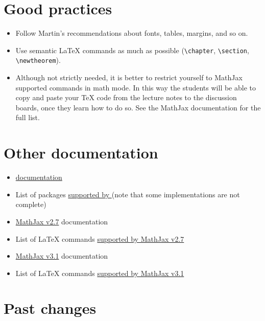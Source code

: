 \documentclass[a4paper]{article}
\def\ltxinline{\lstinline[style=latexml,frame=none]}
\theoremstyle{definition}
\begin{document}
\section{Good practices}
\begin{itemize}
  \item Follow Martin's recommendations about fonts, tables, margins, and so on.
  \item Use semantic \LaTeX{} commands as much as possible (\ltxinline|\chapter|, \ltxinline|\section|, \ltxinline|\newtheorem|).
  \item Although not strictly needed, it is better to restrict yourself to MathJax supported commands in math mode. In this way the students will be able to copy and paste your \TeX{} code from the lecture notes to the discussion boards, once they learn how to do so. See the MathJax documentation for the full list.
\end{itemize}

\section{Other documentation}
\begin{itemize}
  \item \href{https://dlmf.nist.gov/LaTeXML/docs.html}{\LaTeXML{} documentation}
  \item List of packages \href{https://dlmf.nist.gov/LaTeXML/manual/included.bindings/}{supported by \LaTeXML{}} (note that some implementations are not complete)
  \item \href{http://docs.mathjax.org/en/v2.7-latest/}{MathJax v2.7} documentation
  \item List of \LaTeX{} commands \href{http://docs.mathjax.org/en/v2.7-latest/tex.html#supported-latex-commands}{supported by MathJax v2.7}
  \item \href{http://docs.mathjax.org/en/v3.1-latest/}{MathJax v3.1} documentation
  \item List of \LaTeX{} commands \href{http://docs.mathjax.org/en/v3.1-latest/input/tex/macros/index.html}{supported by MathJax v3.1}
\end{itemize}

\section{Past changes}
\end{document}

